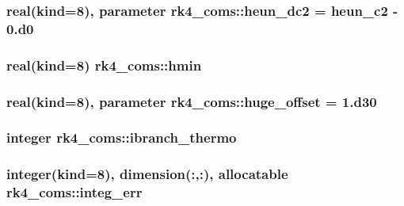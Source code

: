 \subsubsection[{heun\+\_\+dc2}]{\setlength{\rightskip}{0pt plus 5cm}real(kind=8), parameter rk4\+\_\+coms\+::heun\+\_\+dc2 = {\bf heun\+\_\+c2} -\/ 0.d0}\label{namespacerk4__coms_ad638286586253a3741b0fd05bd2456a3}
\hypertarget{namespacerk4__coms_a5bf08e5e23fca150f09adc446272b7fb}{}
\subsubsection[{hmin}]{\setlength{\rightskip}{0pt plus 5cm}real(kind=8) rk4\+\_\+coms\+::hmin}\label{namespacerk4__coms_a5bf08e5e23fca150f09adc446272b7fb}
\hypertarget{namespacerk4__coms_a09bb1518d1ed93891ef24fa73feb7cbe}{}
\subsubsection[{huge\+\_\+offset}]{\setlength{\rightskip}{0pt plus 5cm}real(kind=8), parameter rk4\+\_\+coms\+::huge\+\_\+offset = 1.d30}\label{namespacerk4__coms_a09bb1518d1ed93891ef24fa73feb7cbe}
\hypertarget{namespacerk4__coms_a33cf51cec0937e19a61030894187ddbc}{}
\subsubsection[{ibranch\+\_\+thermo}]{\setlength{\rightskip}{0pt plus 5cm}integer rk4\+\_\+coms\+::ibranch\+\_\+thermo}\label{namespacerk4__coms_a33cf51cec0937e19a61030894187ddbc}
\hypertarget{namespacerk4__coms_aecab6dfff0aaea0938b5c59d550860bc}{}
\subsubsection[{integ\+\_\+err}]{\setlength{\rightskip}{0pt plus 5cm}integer(kind=8), dimension(\+:,\+:), allocatable rk4\+\_\+coms\+::integ\+\_\+err}\label{namespacerk4__coms_aecab6dfff0aaea0938b5c59d550860bc}
\hypertarget{namespacerk4__coms_a4f5c8dc79c821a459a356f283b4831c8}{}
